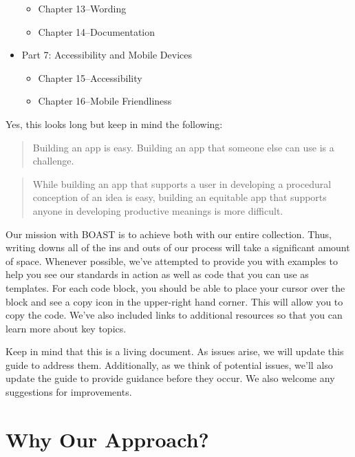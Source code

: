 \documentclass[
]{book}
\providecommand{\tightlist}{%
  \setlength{\itemsep}{0pt}\setlength{\parskip}{0pt}}
\begin{document}
\begin{itemize}
  \begin{itemize}
  \tightlist
  \item
    Chapter 13--Wording
  \item
    Chapter 14--Documentation
  \end{itemize}
\item
  Part 7: Accessibility and Mobile Devices

  \begin{itemize}
  \tightlist
  \item
    Chapter 15--Accessibility
  \item
    Chapter 16--Mobile Friendliness
  \end{itemize}
\end{itemize}

Yes, this looks long but keep in mind the following:

\begin{quote}
Building an app is easy.
Building an app that someone else can use is a challenge.
\end{quote}

\begin{quote}
While building an app that supports a user in developing a procedural conception of an idea is easy, building an equitable app that supports anyone in developing productive meanings is more difficult.
\end{quote}

Our mission with BOAST is to achieve both with our entire collection. Thus, writing downs all of the ins and outs of our process will take a significant amount of space. Whenever possible, we've attempted to provide you with examples to help you see our standards in action as well as code that you can use as templates. For each code block, you should be able to place your cursor over the block and see a copy icon in the upper-right hand corner. This will allow you to copy the code. We've also included links to additional resources so that you can learn more about key topics.

Keep in mind that this is a living document. As issues arise, we will update this guide to address them. Additionally, as we think of potential issues, we'll also update the guide to provide guidance before they occur. We also welcome any suggestions for improvements.

\hypertarget{why-our-approach}{%
\section{Why Our Approach?}\label{why-our-approach}}
\end{document}
